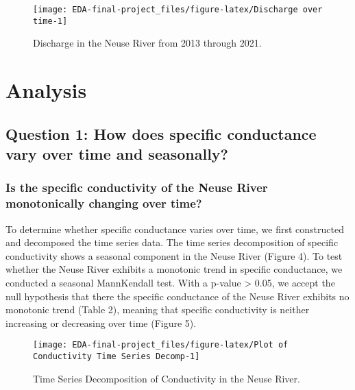 \documentclass[
  12pt,
]{article}
\begin{document}
\begin{figure}

\texttt{[image: EDA-final-project\_files/figure-latex/Discharge over time-1]} \hfill{}

\caption{Discharge in the Neuse River from 2013 through 2021.}\label{fig:Discharge over time}
\end{figure}

\newpage

\hypertarget{analysis}{%
\section{Analysis}\label{analysis}}

\hypertarget{question-1-how-does-specific-conductance-vary-over-time-and-seasonally}{%
\subsection{Question 1: How does specific conductance vary over time and
seasonally?}\label{question-1-how-does-specific-conductance-vary-over-time-and-seasonally}}

\hypertarget{is-the-specific-conductivity-of-the-neuse-river-monotonically-changing-over-time}{%
\subsubsection{Is the specific conductivity of the Neuse River
monotonically changing over
time?}\label{is-the-specific-conductivity-of-the-neuse-river-monotonically-changing-over-time}}

To determine whether specific conductance varies over time, we first
constructed and decomposed the time series data. The time series
decomposition of specific conductivity shows a seasonal component in the
Neuse River (Figure 4). To test whether the Neuse River exhibits a
monotonic trend in specific conductance, we conducted a seasonal
MannKendall test. With a p-value \textgreater{} 0.05, we accept the null
hypothesis that there the specific conductance of the Neuse River
exhibits no monotonic trend (Table 2), meaning that specific
conductivity is neither increasing or decreasing over time (Figure 5).

\begin{figure}

{\centering \texttt{[image: EDA-final-project\_files/figure-latex/Plot of Conductivity Time Series Decomp-1]} 

}

\caption{Time Series Decomposition of Conductivity in the Neuse River.}\label{fig:Plot of Conductivity Time Series Decomp}
\end{figure}
\end{document}
